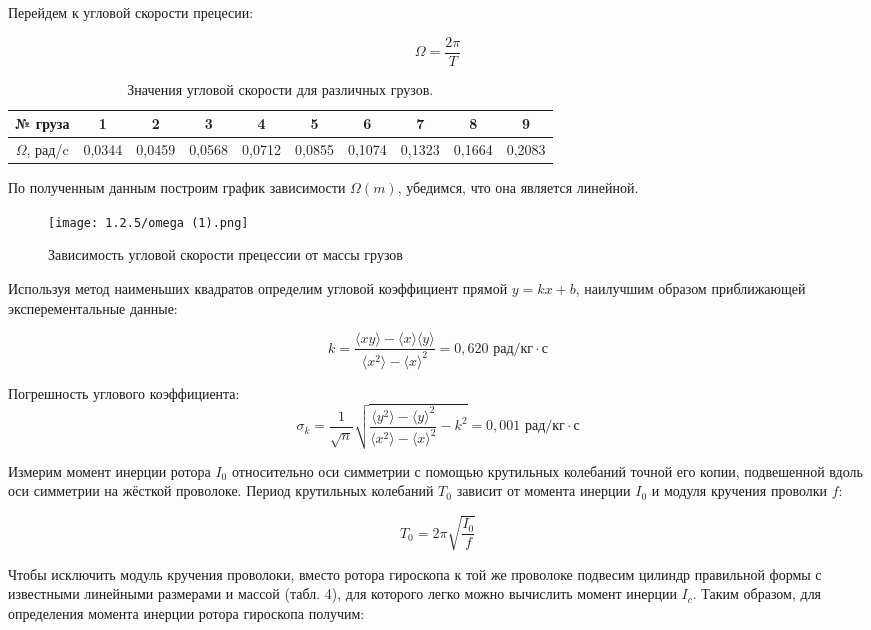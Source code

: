 \documentclass[12pt]{article}
\begin{document}
Перейдем к угловой скорости прецесии:

$$\Omega = \frac{2 \pi}{T}$$

\begin{table}[h!]
	\centering
	\begin{tabular}{|c|c|c|c|c|c|c|c|c|c|}
		\hline
		№ груза & 1      & 2      & 3      & 4      & 5      & 6      & 7      & 8 & 9     \\ \hline
		$\Omega$, рад/c   & 0,0344 & 0,0459 & 0,0568 & 0,0712 & 0,0855 & 0,1074 & 0,1323 & 0,1664 & 0,2083\\ \hline
	\end{tabular}
	\caption{Значения угловой скорости для различных грузов.}
\end{table}

По полученным данным построим график зависимости $\Omega (m)$, убедимся, что она является линейной.

\newpage 

\begin{figure}[h!]
        \vspace{-2ex} 
	\begin{center}
	\texttt{[image: 1.2.5/omega (1).png]}
        \end{center}
	\caption{Зависимость угловой скорости прецессии от массы грузов}
\end{figure}

Используя метод наименьших квадратов определим угловой коэффициент прямой $y = kx + b$, наилучшим образом приближающей эксперементальные данные:

$$k = \frac{\langle xy \rangle - \langle x \rangle \langle y \rangle}{\langle x^2 \rangle - \langle x \rangle^2} = 0,620 \text{ рад}/\text{кг} \cdot \text{с}$$

Погрешность углового коэффициента:
$$\sigma_k = \frac{1}{\sqrt{n}}\sqrt{\frac{\langle y^2 \rangle - \langle y \rangle^2}{\langle x^2 \rangle - \langle x \rangle^2} - k^2} = 0,001 \text{ рад}/\text{кг} \cdot \text{с}$$

Измерим момент инерции ротора $I_0$ относительно оси симметрии с помощью крутильных колебаний точной его копии, подвешенной вдоль оси симметрии на жёсткой проволоке. Период крутильных колебаний $T_0$ зависит от момента инерции $I_0$ и модуля кручения проволки $f$:

$$T_0 = 2\pi \sqrt{\frac{I_0}{f}}$$

Чтобы исключить модуль кручения проволоки, вместо ротора гироскопа к той же проволоке подвесим цилиндр правильной формы с известными линейными размерами и массой (табл. 4), для которого легко можно вычислить момент инерции $I_c$. Таким образом, для определения момента инерции ротора гироскопа получим:
\end{document}
